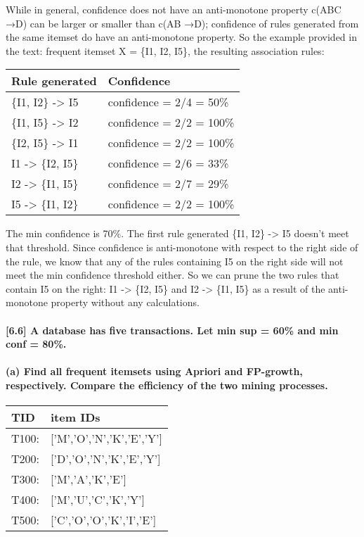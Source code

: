 \documentclass[11pt]{article}
\begin{document}
While in general, confidence does not have an anti-monotone property
c(ABC →D) can be larger or smaller than c(AB →D); confidence of rules
generated from the same itemset do have an anti-monotone property. So
the example provided in the text: frequent itemset X = \{I1, I2, I5\},
the resulting association rules:

\begin{longtable}[]{@{}ll@{}}
\toprule
Rule generated & Confidence\tabularnewline
\midrule
\endhead
\{I1, I2\} -\textgreater{} I5 & confidence = 2/4 = 50\%\tabularnewline
\{I1, I5\} -\textgreater{} I2 & confidence = 2/2 = 100\%\tabularnewline
\{I2, I5\} -\textgreater{} I1 & confidence = 2/2 = 100\%\tabularnewline
I1 -\textgreater{} \{I2, I5\} & confidence = 2/6 = 33\%\tabularnewline
I2 -\textgreater{} \{I1, I5\} & confidence = 2/7 = 29\%\tabularnewline
I5 -\textgreater{} \{I1, I2\} & confidence = 2/2 = 100\%\tabularnewline
\bottomrule
\end{longtable}

The min confidence is 70\%. The first rule generated \{I1, I2\}
-\textgreater{} I5 doesn't meet that threshold. Since confidence is
anti-monotone with respect to the right side of the rule, we know that
any of the rules containing I5 on the right side will not meet the min
confidence threshold either. So we can prune the two rules that contain
I5 on the right: I1 -\textgreater{} \{I2, I5\} and I2 -\textgreater{}
\{I1, I5\} as a result of the anti-monotone property without any
calculations.

    \paragraph{{[}6.6{]} A database has five transactions. Let min sup =
60\% and min conf =
80\%.}\label{a-database-has-five-transactions.-let-min-sup-60-and-min-conf-80.}

    \paragraph{(a) Find all frequent itemsets using Apriori and FP-growth,
respectively. Compare the efficiency of the two mining
processes.}\label{a-find-all-frequent-itemsets-using-apriori-and-fp-growth-respectively.-compare-the-efficiency-of-the-two-mining-processes.}

    \begin{longtable}[]{@{}ll@{}}
\toprule
TID & item IDs\tabularnewline
\midrule
\endhead
T100: & {[}'M','O','N','K','E','Y'{]}\tabularnewline
T200: & {[}'D','O','N','K','E','Y'{]}\tabularnewline
T300: & {[}'M','A','K','E'{]}\tabularnewline
T400: & {[}'M','U','C','K','Y'{]}\tabularnewline
T500: & {[}'C','O','O','K','I','E'{]}\tabularnewline
\bottomrule
\end{longtable}
\end{document}

